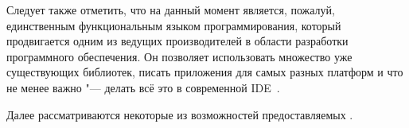 Следует также отметить, что на данный момент \fsharp{} является, пожалуй, единственным функциональным языком программирования, который продвигается одним из ведущих производителей в области разработки программного обеспечения.
Он позволяет использовать множество уже существующих библиотек, писать приложения для самых разных платформ и что не менее важно "---
делать всё это в современной IDE~\cite{fsharp_pfp_issue_5}.

Далее рассматриваются некоторые из возможностей предоставляемых \fsharp{}.
